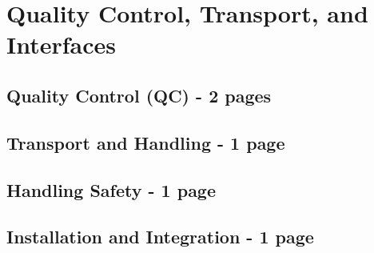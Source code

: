\section{Quality Control, Transport, and Interfaces}
\label{sec:fddp-hv-transport}

\subsection{Quality Control (QC) - 2 pages}
\label{sec:fddp-hv-transport-QC}
\subsection{Transport and Handling - 1 page}
\label{sec:fddp-hv-transport-transport}

\subsection{Handling Safety -  1 page}
\label{sec:fddp-hv-transport-safety}


\subsection{Installation and Integration -  1 page}
\label{sec:fddp-hv-transport-install}

\clearpage
